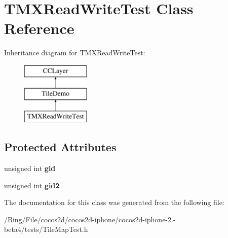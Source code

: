 \hypertarget{interface_t_m_x_read_write_test}{\section{T\-M\-X\-Read\-Write\-Test Class Reference}
\label{interface_t_m_x_read_write_test}
}
Inheritance diagram for T\-M\-X\-Read\-Write\-Test\-:\begin{figure}[H]
\begin{center}
\leavevmode
\includegraphics[height=3.000000cm]{interface_t_m_x_read_write_test}
\end{center}
\end{figure}
\subsection*{Protected Attributes}
\begin{DoxyCompactItemize}
\item 
\hypertarget{interface_t_m_x_read_write_test_a7587d6eae8181b13445d8970f136bc09}{unsigned int {\bfseries gid}}\label{interface_t_m_x_read_write_test_a7587d6eae8181b13445d8970f136bc09}

\item 
\hypertarget{interface_t_m_x_read_write_test_a5d2ee361b1c610c5eae43052b124680d}{unsigned int {\bfseries gid2}}\label{interface_t_m_x_read_write_test_a5d2ee361b1c610c5eae43052b124680d}

\end{DoxyCompactItemize}


The documentation for this class was generated from the following file\-:\begin{DoxyCompactItemize}
\item 
/\-Bing/\-File/cocos2d/cocos2d-\/iphone/cocos2d-\/iphone-\/2.-\/beta4/tests/Tile\-Map\-Test.\-h\end{DoxyCompactItemize}
